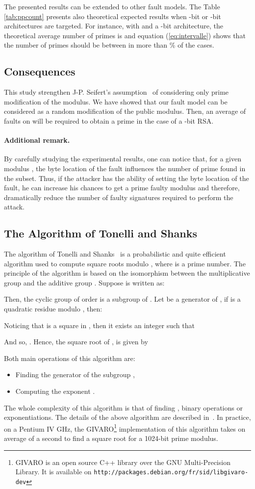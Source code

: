 \documentclass{article}
\begin{document}
The presented results can be extended to other fault models. The Table
\ref{tab:ppcount} presents also theoretical expected results when
-bit or -bit architectures are targeted.
For instance, with  and a -bit architecture, the theoretical
average number of primes 
is  and equation (\ref{eq:intervalle}) shows that the number
of primes should be between  in more than \% of the 
cases.


\subsection{Consequences} This study strengthen J-P. Seifert's assumption~\cite{67,13} of considering only prime modification of the modulus. We have showed that our fault model can be considered as a random modification of the public modulus. Then, an average of  faults on  will be required to obtain a prime  in the case of a -bit RSA.
\paragraph{Additional remark.}
By carefully studying the experimental results, one can notice that,
for a given modulus , the byte location of the fault influences the
number of prime found in the subset. Thus, if the attacker has the
ability of setting the byte location of the fault, he can increase his
chances to get a prime faulty modulus and therefore, dramatically reduce the number of faulty signatures required to perform the attack.

\subsection{The Algorithm of Tonelli and Shanks}
\label{sec:ts}
The algorithm of Tonelli and Shanks~\cite{79} is a probabilistic and quite efficient algorithm used to compute square roots modulo , where  is a prime number.
The principle of the algorithm is based on the isomorphism between the multiplicative group  and the additive group . Suppose  is written as:

Then, the cyclic group  of order  is a subgroup of .
Let  be a generator of , if  is a quadratic residue modulo , then:

Noticing that  is a square in , then it exists an integer  such that

And so, . Hence, the square root of , is given by

Both main operations of this algorithm are:
\begin{itemize}
 \item Finding the generator  of the subgroup ,
 \item Computing the exponent .
\end{itemize}
The whole complexity of this algorithm is that of finding ,  binary operations or  exponentiations. The details of the above algorithm
are described in~\cite{79}. In practice, on a Pentium IV GHz, the
GIVARO\footnote[2]{GIVARO is an open source C++ library over the GNU
  Multi-Precision Library. It is available on
  \texttt{http://packages.debian.org/fr/sid/libgivaro-dev}}
implementation of this algorithm takes on average  of a second
to find a square root for a 1024-bit prime modulus. 
\end{document}
